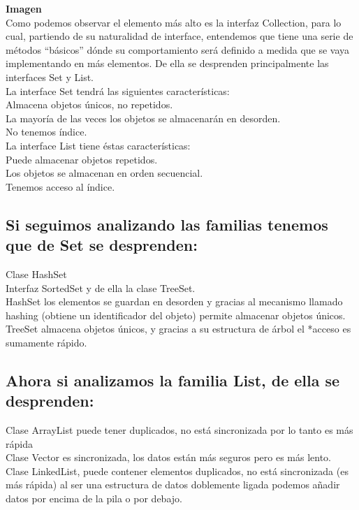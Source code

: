 \documentclass{article}
\begin{document}
\textbf{Imagen}\\

Como podemos observar el elemento más alto es la interfaz Collection, para lo
cual, partiendo de su naturalidad de interface, entendemos que tiene una serie
de métodos “básicos” dónde su comportamiento será definido a medida que se vaya
implementando en más elementos. De ella se desprenden principalmente las
interfaces Set y List.\\

La interface Set tendrá las siguientes características:\\

Almacena objetos únicos, no repetidos.\\
La mayoría de las veces los objetos se almacenarán en desorden.\\
No tenemos índice.\\

La interface List tiene éstas características:\\

Puede almacenar objetos repetidos.\\
Los objetos se almacenan en orden secuencial.\\
Tenemos acceso al índice.\\

\subsection*{Si seguimos analizando las familias tenemos que de Set se desprenden:}%
Clase HashSet\\
Interfaz SortedSet y de ella la clase TreeSet.\\

HashSet los elementos se guardan en desorden y gracias al mecanismo llamado
hashing (obtiene un identificador del objeto) permite almacenar objetos únicos.\\

TreeSet almacena objetos únicos, y gracias a su estructura de árbol el *acceso
es sumamente rápido.\\

\subsection*{Ahora si analizamos la familia List, de ella se desprenden:}%
Clase ArrayList puede tener duplicados, no está sincronizada por lo tanto es
más rápida\\
Clase Vector es sincronizada, los datos están más seguros pero es más lento.\\
Clase LinkedList, puede contener elementos duplicados, no está sincronizada (es
más rápida) al ser una estructura de datos doblemente ligada podemos añadir
datos por encima de la pila o por debajo.\\
\end{document}
